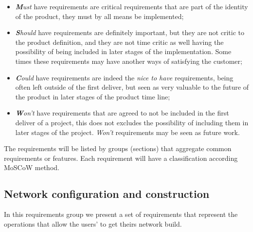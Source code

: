 \begin{itemize}
    \item \textit{\textbf{M}ust} have requirements are critical requirements that are part of the identity of the product, they must by all means be implemented;
    \item \textit{\textbf{S}hould} have requirements are definitely important, but they are not critic to the product definition, and they are not time critic as well having the possibility of being included in later stages of the implementation. Some times these requirements may have another ways of satisfying the customer;
    \item \textit{\textbf{C}ould} have requirements are indeed the \textit{nice to have} requirements, being often left outside of the first deliver, but seen as very valuable to the future of the product in later stages of the product time line;
    \item \textit{\textbf{W}on't} have requirements that are agreed to not be included in the first deliver of a project, this does not excludes the possibility of including them in later stages of the project. \textit{Won't} requirements may be seen as future work.
\end{itemize}

The requirements will be listed by groups (sections) that aggregate common requirements or features. Each requirement will have a classification according MoSCoW method.

\subsection{Network configuration and construction}

In this requirements group we present a set of requirements that represent the operations that allow the users' to get theirs network build.

